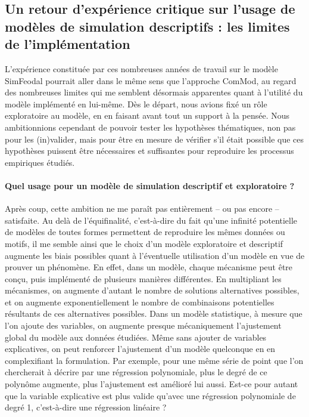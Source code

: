 \subsection{Un retour d'expérience critique sur l'usage de modèles de simulation descriptifs : les limites de l'implémentation}

L'expérience constituée par ces nombreuses années de travail sur le modèle SimFeodal pourrait aller dans le même sens que l'approche ComMod, au regard des nombreuses limites qui me semblent désormais apparentes quant à l'utilité du modèle implémenté en lui-même.
Dès le départ, nous avions fixé un rôle exploratoire au modèle, en en faisant avant tout un support à la pensée.
Nous ambitionnions cependant de pouvoir tester les hypothèses thématiques, non pas pour les (in)valider, mais pour être en mesure de vérifier s'il était possible que ces hypothèses puissent être nécessaires et suffisantes pour reproduire les processus empiriques étudiés.

\paragraph{Quel usage pour un modèle de simulation descriptif et exploratoire ?}

Après coup, cette ambition ne me paraît pas entièrement -- ou pas encore -- satisfaite.
Au delà de l'équifinalité, c'est-à-dire du fait qu'une infinité potentielle de modèles de toutes formes permettent de reproduire les mêmes données ou motifs, il me semble ainsi que le choix d'un modèle exploratoire et descriptif augmente les biais possibles quant à l'éventuelle utilisation d'un modèle en vue de prouver un phénomène.
En effet, dans un modèle, chaque mécanisme peut être conçu, puis implémenté de plusieurs manières différentes.
En multipliant les mécanismes, on augmente d'autant le nombre de solutions alternatives possibles, et on augmente exponentiellement le nombre de combinaisons potentielles résultants de ces alternatives possibles.
Dans un modèle statistique, à mesure que l'on ajoute des variables, on augmente presque mécaniquement l'ajustement global du modèle aux données étudiées.
Même sans ajouter de variables explicatives, on peut renforcer l'ajustement d'un modèle quelconque en en complexifiant la formulation.
Par exemple, pour une même série de point que l'on chercherait à décrire par une régression polynomiale, plus le degré de ce polynôme augmente, plus l'ajustement est amélioré lui aussi.
Est-ce pour autant que la variable explicative est plus valide qu'avec une régression polynomiale de degré 1, c'est-à-dire une régression linéaire ?

